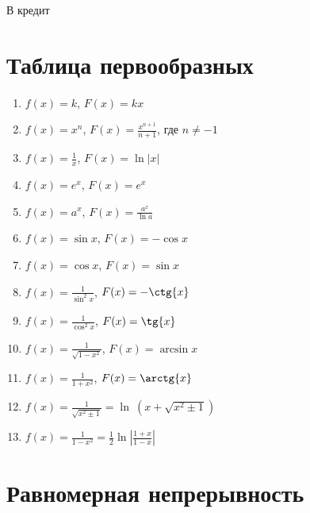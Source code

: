 \documentclass{article}
\begin{document}
		В кредит
			
	\newpage
		
	\section{Таблица первообразных}
		
		\begin{enumerate}
			
			\item $f(x) = k$, $F(x) = kx$
				
			\item $f(x) = x^n$, $F(x) = \frac{x^{n + 1}}{n + 1}$, где $n \neq -1$
				
			\item $f(x) = \frac{1}{x}$, $F(x) = \ln |x|$
				
			\item $f(x) = e^x$, $F(x) = e^x$
				
			\item $f(x) = a^x$, $F(x) = \frac{a^x}{\ln a}$
				
			\item $f(x) = \sin{x}$, $F(x) = -\cos{x}$
				
			\item $f(x) = \cos{x}$, $F(x) = \sin{x}$
				
			\item $f(x) = \frac{1}{\sin^2{x}}$, $F(x) = -\ctg{x}$
				
			\item $f(x) = \frac{1}{\cos^2{x}}$, $F(x) = \tg{x}$
				
			\item $f(x) = \frac{1}{\sqrt{1 - x^2}}$, $F(x) = \arcsin{x}$
				
			\item $f(x) = \frac{1}{1 + x^2}$, $F(x) = \arctg{x}$
			
			\item $f(x) = \frac{1}{\sqrt{x^2 \pm 1}} = \ln~(x + \sqrt{x^2 \pm 1})$
			
			\item $f(x) = \frac{1}{1 - x^2} = \frac{1}{2} \ln{\left| \frac{1+x}{1-x} \right|}$
				
		\end{enumerate}
			
	\newpage
		
	\section{Равномерная непрерывность}
		
\end{document}
